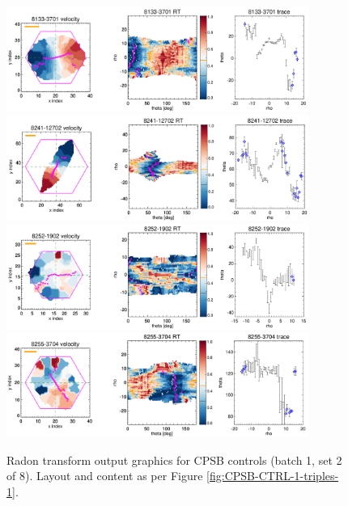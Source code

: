 \documentclass[fleqn,usenatbib]{mnras}
\begin{document}
\begin{figure}
    \centering
    \includegraphics[width=0.88\textwidth]{Images/SN1-MC250/CPSB-CTRL-1-triples/8133-3701-1-250-10.png}
    \includegraphics[width=0.88\textwidth]{Images/SN1-MC250/CPSB-CTRL-1-triples/8241-12702-1-250-10.png}
    \includegraphics[width=0.88\textwidth]{Images/SN1-MC250/CPSB-CTRL-1-triples/8252-1902-1-250-10.png}
    \includegraphics[width=0.88\textwidth]{Images/SN1-MC250/CPSB-CTRL-1-triples/8255-3704-1-250-10.png}    
    \caption{Radon transform output graphics for CPSB controls (batch 1, set 2 of 8). Layout and content as per Figure \ref{fig:CPSB-CTRL-1-triples-1}.}
    \label{fig:CPSB-CTRL-1-triples-2}
\end{figure}
\end{document}
